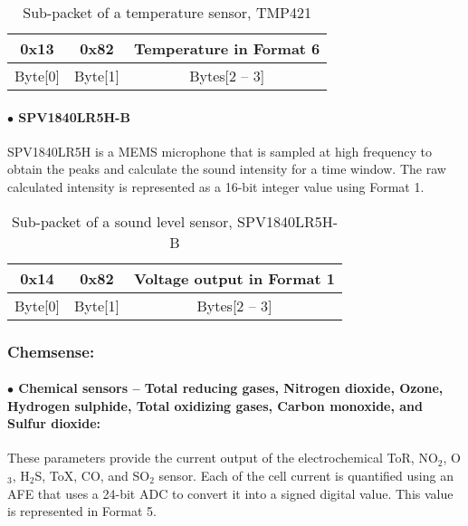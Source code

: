 \begin{table}[h!]
    \centering
    \caption{Sub-packet of a temperature sensor, TMP421}
    \begin{tabular}{|c|c|c|}
        \hline
        \rowcolor{black!8}
        \textbf{0x13} & \textbf{0x82} & \textbf{Temperature in Format 6}\\
        \hline
        Byte[0] & Byte[1] & Bytes[2 -- 3] \\ \hline
    \end{tabular}
\end{table}


\paragraph{$\bullet$ SPV1840LR5H-B}

SPV1840LR5H is a MEMS microphone that is sampled at high frequency to obtain
the peaks and calculate the sound intensity for a time window. The raw calculated
intensity is represented as a 16-bit integer value using Format 1.

\begin{table}[h!]
    \centering
    \caption{Sub-packet of a sound level sensor, SPV1840LR5H-B}
    \begin{tabular}{|c|c|c|}
        \hline
        \rowcolor{black!8}
        \textbf{0x14} & \textbf{0x82} & \textbf{Voltage output in Format 1}\\
        \hline
        Byte[0] & Byte[1] & Bytes[2 -- 3] \\ \hline
    \end{tabular}
\end{table}


\subsubsection{Chemsense:}

\paragraph{$\bullet$ Chemical sensors -- Total reducing gases, Nitrogen dioxide, Ozone, Hydrogen sulphide, Total oxidizing gases, Carbon monoxide, and Sulfur dioxide:}
These parameters provide the current output of the electrochemical ToR, NO$_2$, O$_3$, H$_2$S, ToX, CO, and SO$_2$ sensor.
Each of the cell current is quantified using an AFE that uses a
24-bit ADC to convert it into a signed digital value. This value is
represented in Format 5.


